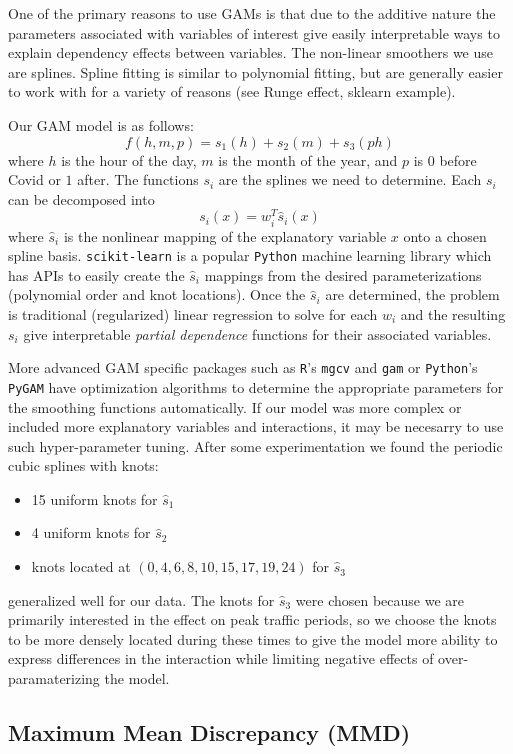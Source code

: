 \documentclass{article}
\begin{document}
One of the primary reasons to use GAMs is that due to the additive nature the parameters associated with variables of interest give easily interpretable ways to explain dependency effects between variables.
The non-linear smoothers we use are splines. Spline fitting is similar to polynomial fitting, but are generally easier to work with for a variety of reasons (see Runge effect, sklearn example). 

Our GAM model is as follows:
$$f(h, m, p) = s_1(h) + s_2(m) + s_3(ph)$$
where $h$ is the hour of the day, $m$ is the month of the year, and $p$ is $0$ before Covid or $1$ after. The functions $s_i$ are the splines we need to determine. Each $s_i$ can be decomposed into
$$s_i(x) = w_i^T \hat s_i(x)$$
where $\hat s_i$ is the nonlinear mapping of the explanatory variable $x$ onto a chosen spline basis. \verb|scikit-learn| is a popular \verb|Python| machine learning library which has APIs to easily create the $\hat s_i$ mappings from the desired parameterizations (polynomial order and knot locations). Once the $\hat s_i$ are determined, the problem is traditional (regularized) linear regression to solve for each $w_i$ and the resulting $s_i$ give interpretable \emph{partial dependence} functions for their associated variables.

More advanced GAM specific packages such as \verb|R|'s \verb|mgcv| and \verb|gam| or \verb|Python|'s \verb|PyGAM| have optimization algorithms to determine the appropriate parameters for the smoothing functions automatically. If our model was more complex or included more explanatory variables and interactions, it may be necesarry to use such hyper-parameter tuning. After some experimentation we found the periodic cubic splines with knots:
\begin{itemize}
    \item 15 uniform knots for $\hat s_1$ 
    \item 4 uniform knots for $\hat s_2$ 
    \item knots located at $(0, 4, 6, 8, 10, 15, 17, 19, 24)$ for $\hat s_3$
\end{itemize}
generalized well for our data. The knots for $\hat s_3$ were chosen because we are primarily interested in the effect on peak traffic periods, so we choose the knots to be more densely located during these times to give the model more ability to express differences in the interaction while limiting negative effects of over-paramaterizing the model.

\subsection{Maximum Mean Discrepancy (MMD)}
\end{document}
